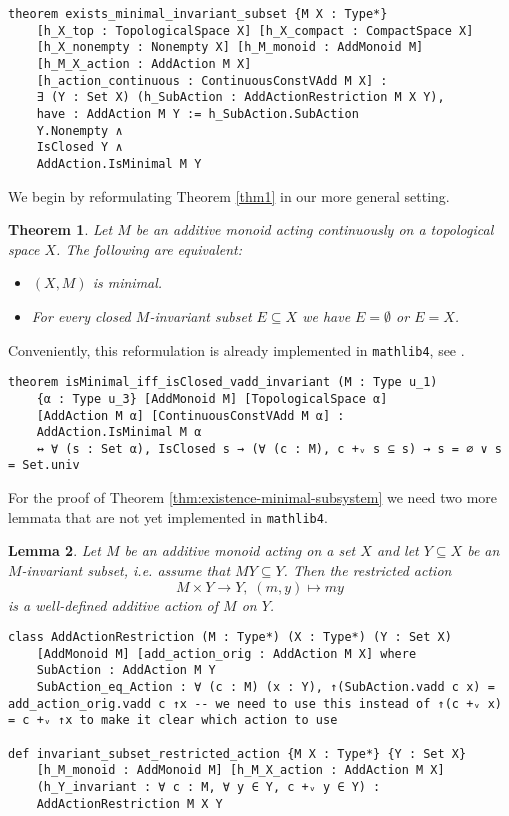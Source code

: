 \documentclass[11pt]{article}
\newtheorem{theorem}{Theorem}[section]
\newtheorem{lemma}[theorem]{Lemma}
\theoremstyle{definition}              %
\theoremstyle{definition}              %
\theoremstyle{definition}              %
\begin{document}
\begin{lstlisting}
theorem exists_minimal_invariant_subset {M X : Type*} 
    [h_X_top : TopologicalSpace X] [h_X_compact : CompactSpace X] 
    [h_X_nonempty : Nonempty X] [h_M_monoid : AddMonoid M] 
    [h_M_X_action : AddAction M X] 
    [h_action_continuous : ContinuousConstVAdd M X] :
    ∃ (Y : Set X) (h_SubAction : AddActionRestriction M X Y),
    have : AddAction M Y := h_SubAction.SubAction
    Y.Nonempty ∧
    IsClosed Y ∧
    AddAction.IsMinimal M Y
\end{lstlisting}

We begin by reformulating Theorem \ref{thm1} in our more general setting.

\begin{theorem}\label{prop:minimal-equivalence}
Let $M$ be an additive monoid acting continuously on a topological space $X$. The following are equivalent:
\begin{itemize}
  \item $(X, M)$ is minimal.
  \item For every closed $M$-invariant subset $E \subseteq X$ we have $E = \emptyset$ or $E = X$.
\end{itemize}
\end{theorem}

Conveniently, this reformulation is already implemented in \texttt{mathlib4}, see \cite{kudry}.

\begin{lstlisting}
theorem isMinimal_iff_isClosed_vadd_invariant (M : Type u_1) 
    {α : Type u_3} [AddMonoid M] [TopologicalSpace α] 
    [AddAction M α] [ContinuousConstVAdd M α] :
    AddAction.IsMinimal M α
    ↔ ∀ (s : Set α), IsClosed s → (∀ (c : M), c +ᵥ s ⊆ s) → s = ∅ ∨ s = Set.univ
\end{lstlisting}



For the proof of Theorem \ref{thm:existence-minimal-subsystem} we need two more lemmata that are not yet implemented in \texttt{mathlib4}.

\begin{lemma}\label{lemma:restricted-action}
Let $M$ be an additive monoid acting on a set $X$ and let $Y \subseteq X$ be an $M$-invariant subset, i.e. assume that $MY \subseteq Y$. Then the restricted action 
\[M \times Y \to Y, \; (m,y) \mapsto my\] 
is a well-defined additive action of $M$ on $Y$.
\end{lemma}


\begin{lstlisting}
class AddActionRestriction (M : Type*) (X : Type*) (Y : Set X) 
    [AddMonoid M] [add_action_orig : AddAction M X] where
    SubAction : AddAction M Y
    SubAction_eq_Action : ∀ (c : M) (x : Y), ↑(SubAction.vadd c x) = add_action_orig.vadd c ↑x -- we need to use this instead of ↑(c +ᵥ x) = c +ᵥ ↑x to make it clear which action to use

def invariant_subset_restricted_action {M X : Type*} {Y : Set X} 
    [h_M_monoid : AddMonoid M] [h_M_X_action : AddAction M X] 
    (h_Y_invariant : ∀ c : M, ∀ y ∈ Y, c +ᵥ y ∈ Y) : 
    AddActionRestriction M X Y
\end{lstlisting}
\end{document}

